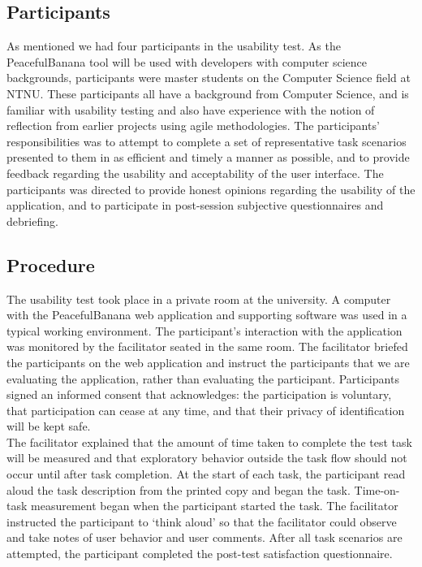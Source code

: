 \subsection{Participants}
As mentioned we had four participants in the usability test. As the PeacefulBanana tool will be used with developers with computer science backgrounds, participants were master students on the Computer Science field at NTNU. These participants all have a background from Computer Science, and is familiar with usability testing and also have experience with the notion of reflection from earlier projects using agile methodologies.
The participants' responsibilities was to attempt to complete a set of representative task scenarios presented to them in as efficient and timely a manner as possible, and to provide feedback regarding the usability and acceptability of the user interface. The participants was directed to provide honest opinions regarding the usability of the application, and to participate in post-session subjective questionnaires and debriefing.

\subsection{Procedure}
The usability test took place in a private room at the university. A computer with the PeacefulBanana web application and supporting software was used in a typical working environment. The participant’s interaction with the application was monitored by the facilitator seated in the same room.
The facilitator briefed the participants on the web application and instruct the participants that we are evaluating the application, rather than evaluating the participant. Participants signed an informed consent that acknowledges: the participation is voluntary, that participation can cease at any time, and that their privacy of identification will be kept safe. \\
The facilitator explained that the amount of time taken to complete the test task will be measured and that exploratory behavior outside the task flow should not occur until after task completion. At the start of each task, the participant read aloud the task description from the printed copy and began the task. Time-on-task measurement began when the participant started the task.
The facilitator instructed the participant to ‘think aloud’ so that the facilitator could observe and take notes of user behavior and user comments.
After all task scenarios are attempted, the participant completed the post-test satisfaction questionnaire.

